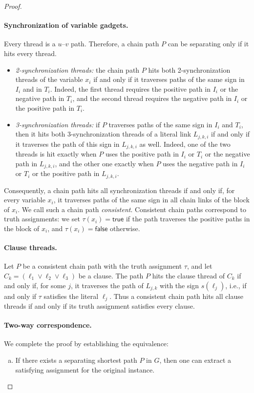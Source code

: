 \begin{proof}
\paragraph{Synchronization of variable gadgets.}
Every thread is a $u$--$v$ path. Therefore, a chain path $P$ can be separating only if it hits every thread.
\begin{itemize}
    \item \emph{2-synchronization threads:} the chain path $P$ hits both 2-synchronization threads of the variable $x_i$ if and only if it traverses paths of the same sign in $I_i$ and in $T_i$.
    Indeed, the first thread requires the positive path in $I_i$ or the negative path in $T_i$, and the second thread requires the negative path in $I_i$ or the positive path in $T_i$.
    \item \emph{3-synchronization threads:} if $P$ traverses paths of the same sign in $I_i$ and $T_i$, then it hits both 3-synchronization threads of a literal link $L_{j,k,i}$ if and only if it traverses the path of this sign in $L_{j,k,i}$ as well.
    Indeed, one of the two threads is hit exactly when $P$ uses the positive path in $I_i$ or $T_i$ or the negative path in $L_{j,k,i}$, and the other one exactly when $P$ uses the negative path in $I_i$ or $T_i$ or the positive path in $L_{j,k,i}$.
\end{itemize}
Consequently, a chain path hits all synchronization threads if and only if, for every variable $x_i$, it traverses paths of the same sign in all chain links of the block of $x_i$.
We call such a chain path \emph{consistent}.
Consistent chain paths correspond to truth assignments: we set $\tau(x_i)=\mathsf{true}$ if the path traverses the positive paths in the block of $x_i$, and $\tau(x_i)=\mathsf{false}$ otherwise.

\paragraph{Clause threads.}
Let $P$ be a consistent chain path with the truth assignment $\tau$, and let $C_k = (\ell_1 \vee \ell_2 \vee \ell_3)$ be a clause.
The path $P$ hits the clause thread of $C_k$ if and only if, for some $j$, it traverses the path of $L_{j,k}$ with the sign $s(\ell_j)$, i.e., if and only if $\tau$ satisfies the literal $\ell_j$.
Thus a consistent chain path hits all clause threads if and only if its truth assignment satisfies every clause.

\paragraph{Two-way correspondence.}
We complete the proof by establishing the equivalence:
\begin{enumerate}[(a)]
    \item If there exists a separating shortest path $P$ in $G$, then one can extract a satisfying assignment for the original \ThreeSAT{} instance.


\end{enumerate}
\end{proof}
